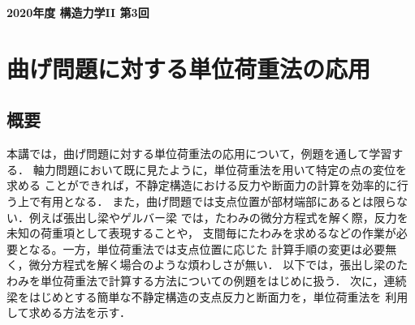 ﻿\documentclass[10pt,a4j]{jarticle}
\newlength{\minitwocolumn}
\begin{document}
\newcommand{\fat}[1]{\mbox{\boldmath $#1$}}
\newcommand{\D}{\partial}
\newcommand{\w}{\omega}
\newcommand{\ga}{\alpha}
\newcommand{\gb}{\beta}
\newcommand{\gx}{\xi}
\newcommand{\gz}{\zeta}
\newcommand{\vhat}[1]{\hat{\fat{#1}}}
\newcommand{\spc}{\vspace{0.7\baselineskip}}
\newcommand{\halfspc}{\vspace{0.3\baselineskip}}

\newcommand{\twofig}[2]
 {
   \begin{figure}
     \begin{minipage}[t]{\minitwocolumn}
         \begin{center}   #1
         \end{center}
     \end{minipage}
         \hspace{\columnsep}
     \begin{minipage}[t]{\minitwocolumn}
         \begin{center} #2
         \end{center}
     \end{minipage}
   \end{figure}
 }
\begin{center}
	{\Large \bf 2020年度 構造力学II 第3回} \\
\end{center}
\setcounter{section}{2}
\section{曲げ問題に対する単位荷重法の応用}
\subsection{概要}
本講では，曲げ問題に対する単位荷重法の応用について，例題を通して学習する．
軸力問題において既に見たように，単位荷重法を用いて特定の点の変位を求める
ことができれば，不静定構造における反力や断面力の計算を効率的に行う上で有用となる．
また，曲げ問題では支点位置が部材端部にあるとは限らない．例えば張出し梁やゲルバー梁
では，たわみの微分方程式を解く際，反力を未知の荷重項として表現することや，
支間毎にたわみを求めるなどの作業が必要となる。一方，単位荷重法では支点位置に応じた
計算手順の変更は必要無く，微分方程式を解く場合のような煩わしさが無い．
以下では，張出し梁のたわみを単位荷重法で計算する方法についての例題をはじめに扱う．
次に，連続梁をはじめとする簡単な不静定構造の支点反力と断面力を，単位荷重法を
利用して求める方法を示す．
\end{document}
